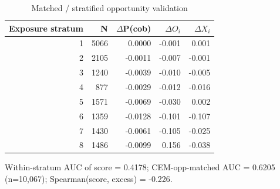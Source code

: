 \begin{table}[htbp]\centering
\caption{Matched / stratified opportunity validation}
\label{tab:opp_matched}
\begin{tabular}{rrrrr}\hline
Exposure stratum & N & $\Delta$P(cob) & $\Delta O_i$ & $\Delta X_i$ \\\hline
1 & 5066 & 0.0000 & -0.001 & 0.001 \\
2 & 2105 & -0.0011 & -0.007 & -0.001 \\
3 & 1240 & -0.0039 & -0.010 & -0.005 \\
4 & 877 & -0.0029 & -0.012 & -0.016 \\
5 & 1571 & -0.0069 & -0.030 & 0.002 \\
6 & 1359 & -0.0128 & -0.101 & -0.107 \\
7 & 1430 & -0.0061 & -0.105 & -0.025 \\
8 & 1486 & -0.0099 & 0.156 & -0.038 \\
\hline\end{tabular}
\begin{tablenotes}\footnotesize\item Within-stratum AUC of score = 0.4178; CEM-opp-matched AUC = 0.6205 (n=10,067); Spearman(score, excess) = -0.226.\end{tablenotes}
\end{table}
